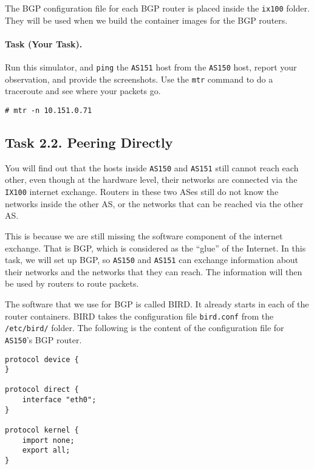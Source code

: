 The BGP configuration file for each BGP router 
is placed inside the \texttt{ix100} folder. They
will be used when we build the container images
for the BGP routers. 


\paragraph{Task (Your Task).} Run this simulator, and \texttt{ping}
the \texttt{AS151} host from the \texttt{AS150} host, report your observation,
and provide the screenshots.  
Use the \texttt{mtr} command to do a traceroute and see 
where your packets go. 
\begin{lstlisting}
# mtr -n 10.151.0.71
\end{lstlisting}


\subsection{Task 2.2. Peering Directly} 

You will find out that the hosts inside \texttt{AS150} and \texttt{AS151}
still cannot reach each other, even though at the 
hardware level, their networks are 
connected via the \texttt{IX100} internet exchange. Routers 
in these two ASes still do not know the networks
inside the other AS, or the networks that can be 
reached via the other AS. 

This is because we are still missing the software component of the internet exchange.
That is BGP, which is considered as the  
``glue'' of the Internet. In this task, we will set up
BGP, so \texttt{AS150} and \texttt{AS151} 
can exchange information about their networks and the networks
that they can reach.  The information will then 
be used by routers to route packets. 


The software that we use for BGP is called BIRD. It already starts 
in each of the router containers. BIRD takes the configuration
file \texttt{bird.conf} from the \texttt{/etc/bird/} folder.   
The following is the content of the configuration file for \texttt{AS150}'s
BGP router.

\begin{lstlisting}[caption={The \texttt{bird.conf} file for \texttt{AS150}}]
protocol device {
}

protocol direct {
    interface "eth0";
}

protocol kernel {      
    import none;
    export all;
}
\end{lstlisting}
 
